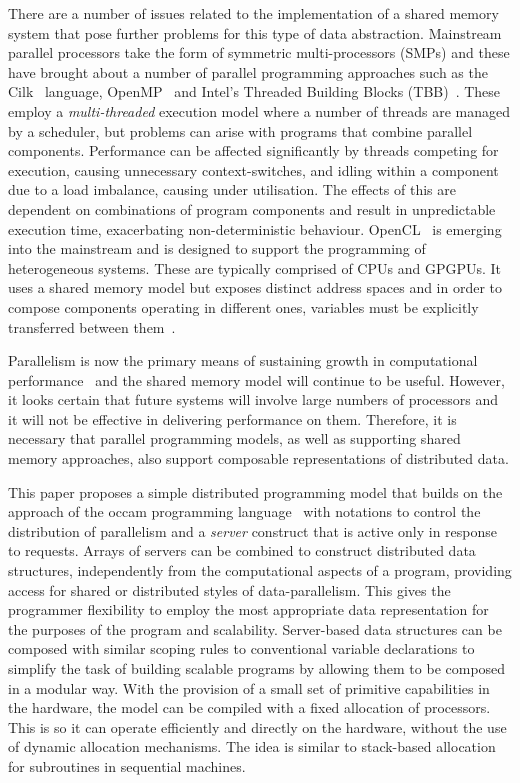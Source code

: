 \documentclass[11pt, conference, compsocconf, onecolumn]{IEEEtran}
\newcounter{process}
\begin{document}
There are a number of issues related to the implementation of a shared memory
system that pose further problems for this type of data abstraction.
Mainstream parallel processors take the form of symmetric multi-processors
(SMPs) and these have brought about a number of parallel programming approaches
such as the Cilk~\cite{Cilk95} language, OpenMP~\cite{OpenMP} and Intel's
Threaded Building Blocks (TBB)~\cite{IntelTBB}. These  employ a
\emph{multi-threaded} execution model where a number of threads are managed by
a scheduler, but problems can arise with programs that combine parallel
components.
Performance can be affected significantly by threads competing for execution,
causing unnecessary context-switches, and idling within a component due to a
load imbalance, causing under utilisation. The effects of this are dependent on
combinations of program components and result in unpredictable execution time,
exacerbating non-deterministic behaviour.
OpenCL~\cite{OpenCL} is emerging into the mainstream and is designed to support
the programming of heterogeneous systems. These are typically comprised of CPUs
and GPGPUs. It uses a shared memory model but exposes distinct address spaces
and in order to compose components operating in different ones, variables must
be explicitly transferred between them~\cite{Gaster12}. 


Parallelism is now the primary means of sustaining growth in computational
performance~\cite{FutureCompPerf} and the shared memory model will continue to
be useful. However, it looks certain that future systems will involve large
numbers of processors and it will not be effective in delivering performance on
them.
Therefore, it is necessary that parallel programming models, as well as
supporting shared memory approaches, also support composable representations of
distributed data.

This paper proposes a simple distributed programming model that builds on the
approach of the occam programming language~\cite{Occam83} with notations to
control the distribution of parallelism and a \emph{server} construct that is
active only in response to requests. 
Arrays of servers can be combined to construct distributed data structures,
independently from the computational aspects of a program, providing access for
shared or distributed styles of data-parallelism.  This gives the programmer
flexibility to employ the most appropriate data representation for the purposes
of the program and scalability. Server-based data structures can be composed
with similar scoping rules to conventional variable declarations to simplify
the task of building scalable programs by allowing them to be composed in a
modular way.
With the provision of a small set of primitive capabilities in the hardware,
the model can be compiled with a fixed allocation of processors. This is so it
can operate efficiently and directly on the hardware, without the use of
dynamic allocation mechanisms. The idea is similar to stack-based allocation
for subroutines in sequential machines. 
\end{document}
